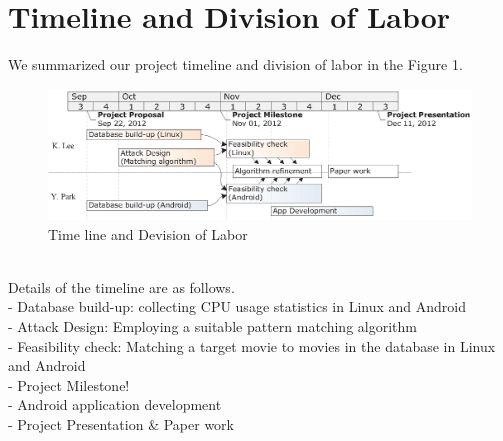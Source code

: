 \section{Timeline and Division of Labor}
\label{sec:timeline}
\indent We summarized our project timeline and division of labor in the Figure 1.\\
\begin{figure}[!ht]
\centering
\includegraphics[scale=1]{Figures/Timeline}
\caption{Time line and Devision of Labor}
\end{figure}\\
Details of the timeline are as follows. \\
- Database build-up: collecting CPU usage statistics in Linux and Android\\
- Attack Design: Employing a suitable pattern matching algorithm\\
- Feasibility check: Matching a target movie to movies in the database in Linux and Android \\
- Project Milestone!\\
- Android application development\\
- Project Presentation \& Paper work
